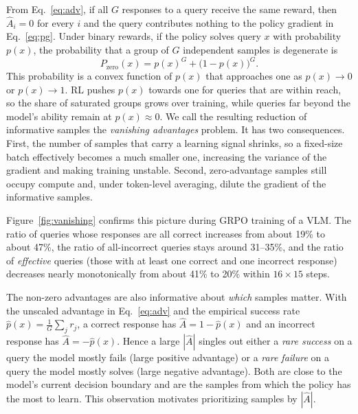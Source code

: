 \documentclass{article}
\begin{document}
From Eq.~\eqref{eq:adv}, if all $G$ responses to a query receive the same reward, then $\hat{A}_i=0$ for every $i$ and the query contributes nothing to the policy gradient in Eq.~\eqref{eq:pg}. Under binary rewards, if the policy solves query $x$ with probability $p(x)$, the probability that a group of $G$ independent samples is degenerate is
\begin{equation}
    P_\text{zero}(x) = p(x)^{G} + \big(1-p(x)\big)^{G}.
    \label{eq:pzero}
\end{equation}
This probability is a convex function of $p(x)$ that approaches one as $p(x)\to 0$ or $p(x)\to 1$. RL pushes $p(x)$ towards one for queries that are within reach, so the share of saturated groups grows over training, while queries far beyond the model's ability remain at $p(x)\approx 0$. We call the resulting reduction of informative samples the \emph{vanishing advantages} problem. It has two consequences. First, the number of samples that carry a learning signal shrinks, so a fixed-size batch effectively becomes a much smaller one, increasing the variance of the gradient and making training unstable. Second, zero-advantage samples still occupy compute and, under token-level averaging, dilute the gradient of the informative samples.

Figure~\ref{fig:vanishing} confirms this picture during GRPO training of a VLM. The ratio of queries whose responses are all correct increases from about 19\% to about 47\%, the ratio of all-incorrect queries stays around 31--35\%, and the ratio of \emph{effective} queries (those with at least one correct and one incorrect response) decreases nearly monotonically from about 41\% to 20\% within $16\times 15$ steps.

The non-zero advantages are also informative about \emph{which} samples matter. With the unscaled advantage in Eq.~\eqref{eq:adv} and the empirical success rate $\hat{p}(x)=\frac{1}{G}\sum_j r_j$, a correct response has $\hat{A}=1-\hat{p}(x)$ and an incorrect response has $\hat{A}=-\hat{p}(x)$. Hence a large $|\hat{A}|$ singles out either a \emph{rare success} on a query the model mostly fails (large positive advantage) or a \emph{rare failure} on a query the model mostly solves (large negative advantage). Both are close to the model's current decision boundary and are the samples from which the policy has the most to learn. This observation motivates prioritizing samples by $|\hat{A}|$.
\end{document}
